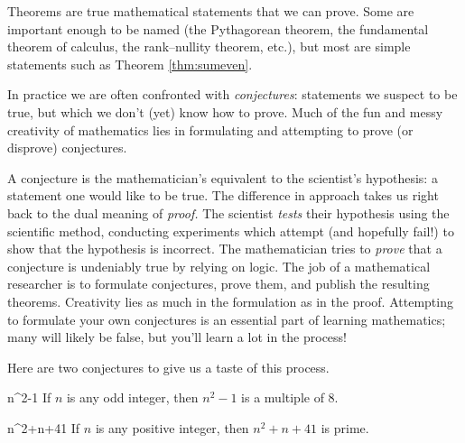 \goodbreak



Theorems are true mathematical statements that we can prove. Some are important enough to be named (the Pythagorean theorem, the fundamental theorem of calculus, the rank--nullity theorem, etc.), but most are simple statements such as Theorem \ref{thm:sumeven}.\smallbreak

In practice we are often confronted with \emph{conjectures}: statements we suspect to be true, but which we don't (yet) know how to prove. Much of the fun and messy creativity of mathematics lies in formulating and attempting to prove (or disprove) conjectures.\smallbreak

A conjecture is the mathematician's equivalent to the scientist's hypothesis: a statement one would like to be true. The difference in approach takes us right back to the dual meaning of \emph{proof.} The scientist \emph{tests} their hypothesis using the scientific method, conducting experiments which attempt (and hopefully fail!) to show that the hypothesis is incorrect. The mathematician tries to \emph{prove} that a conjecture is undeniably true by relying on logic. The job of a mathematical researcher is to formulate conjectures, prove them, and publish the resulting theorems. Creativity lies as much in the formulation as in the proof. Attempting to formulate your own conjectures is an essential part of learning mathematics; many will likely be false, but you'll learn a lot in the process!\medbreak

Here are two conjectures to give us a taste of this process.

\begin{conj}{}{n^2-1}
	If $n$ is any odd integer, then $n^2-1$ is a multiple of 8.
\end{conj}

\begin{conj}{}{n^2+n+41}
	If $n$ is any positive integer, then $n^2+n+41$ is prime.\footnotemark
\end{conj}


